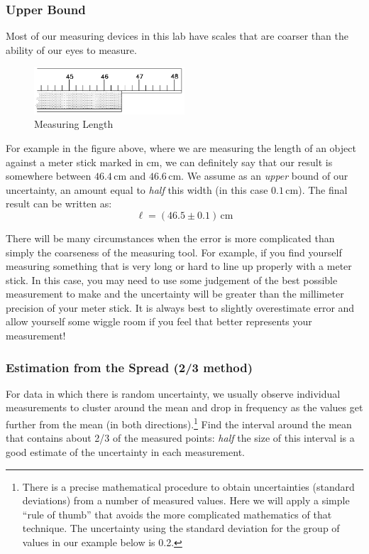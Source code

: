 \subsubsection{Upper Bound}

Most of our measuring devices in this lab have scales that are coarser than the ability of our eyes to measure.

\begin{figure}[h]
    \begin{center}
        \includegraphics[width=0.5\textwidth]{./Exp1/pic/image1.png}
    \end{center}
    \caption{Measuring Length}
    \label{fig:measure}
\end{figure}

For example in the figure above, where we are measuring the length of an object against a meter stick marked in cm, we can definitely say that our result is somewhere between $46.4\,\mathrm{cm}$ and $46.6\,\mathrm{cm}$. We assume as an \emph{upper} bound of our uncertainty, an amount equal to \emph{half} this width (in this case $0.1\,\mathrm{cm}$). The final result can be written as:
\begin{equation}
    \ell = (46.5\pm 0.1)\,\mathrm{cm}
\end{equation}

There will be many circumstances when the error is more complicated than simply the coarseness of the measuring tool. For example, if you find yourself measuring something that is very long or hard to line up properly with a meter stick. In this case, you may need to use some judgement of the best possible measurement to make and the uncertainty will be greater than the millimeter precision of your meter stick. It is always best to slightly overestimate error and allow yourself some wiggle room if you feel that better represents your measurement!

\subsubsection{Estimation from the Spread (2/3 method)}

For data in which there is random uncertainty, we usually observe individual measurements to cluster around the mean and drop in frequency as the values get further from the mean (in both directions).\footnote{There is a precise mathematical procedure to obtain uncertainties (standard deviations) from a number of measured values. Here we will apply a simple ``rule of thumb'' that avoids the more complicated mathematics of that technique. The uncertainty using the standard deviation for the group of values in our example below is 0.2.}  Find the interval around the mean that contains about 2/3 of the measured points: \emph{half} the size of this interval is a good estimate of the uncertainty in each measurement. \myskip

